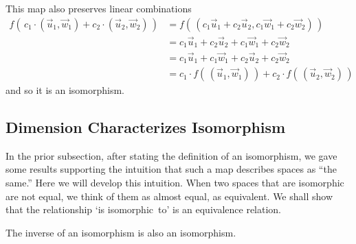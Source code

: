 \begin{exercises}
\begin{answer}
\begin{exparts}
          This map also preserves linear combinations
          \begin{align*}
            f(\,c_1\cdot(\vec{u}_1,\vec{w}_1)+c_2\cdot (\vec{u}_2,\vec{w}_2)\,)
            &=f(\,(c_1\vec{u}_1+c_2\vec{u}_2,c_1\vec{w}_1+c_2\vec{w}_2)\,) \\
            &=c_1\vec{u}_1+c_2\vec{u}_2+c_1\vec{w}_1+c_2\vec{w}_2    \\
            &=c_1\vec{u}_1+c_1\vec{w}_1+c_2\vec{u}_2+c_2\vec{w}_2    \\
            &=c_1\cdot f(\,(\vec{u}_1,\vec{w}_1)\,)
               +c_2\cdot f(\,(\vec{u}_2,\vec{w}_2)\,)
          \end{align*}
          and so it is an isomorphism.
      \end{exparts}     
    \end{answer}
\end{exercises}












\subsection{Dimension Characterizes Isomorphism}

In the prior subsection, after stating the definition of an isomorphism,
we gave some results supporting the intuition that such a map describes 
spaces as ``the same.'' 
Here we will develop this intuition.
When two spaces that are isomorphic are not equal, we think of them
as almost equal, as equivalent.
We shall show that the relationship `is isomorphic~to' is an equivalence
relation.

\begin{lemma}  \label{lem:IsoInvAlsoIso}
The inverse of an isomorphism is also an isomorphism.
\end{lemma}

